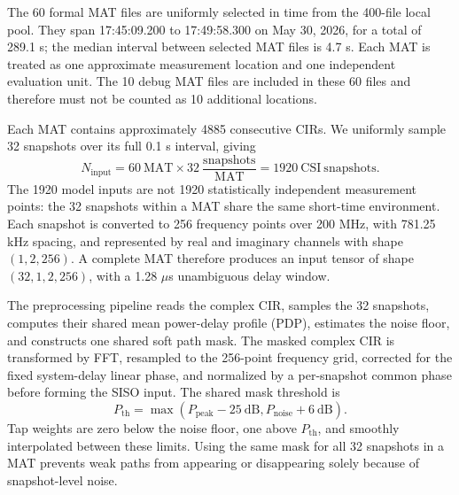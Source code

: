 The 60 formal MAT files are uniformly selected in time from the 400-file local pool. They span
17:45:09.200 to 17:49:58.300 on May 30, 2026, for a total of 289.1 s; the median interval between
selected MAT files is 4.7 s. Each MAT is treated as one approximate measurement location and one
independent evaluation unit. The 10 debug MAT files are included in these 60 files and therefore
must not be counted as 10 additional locations.

Each MAT contains approximately 4885 consecutive CIRs. We uniformly sample 32 snapshots over its
full 0.1 s interval, giving
\begin{equation}
N_{\mathrm{input}}=60\ \mathrm{MAT}\times32\
\frac{\mathrm{snapshots}}{\mathrm{MAT}}=1920\ \mathrm{CSI\ snapshots}.
\label{eq:measured-snapshot-count}
\end{equation}
The 1920 model inputs are not 1920 statistically independent measurement points: the 32 snapshots
within a MAT share the same short-time environment. Each snapshot is converted to 256 frequency
points over 200 MHz, with 781.25 kHz spacing, and represented by real and imaginary channels with
shape \((1,2,256)\). A complete MAT therefore produces an input tensor of shape
\((32,1,2,256)\), with a 1.28 \(\mu\)s unambiguous delay window.

The preprocessing pipeline reads the complex CIR, samples the 32 snapshots, computes their shared
mean power-delay profile (PDP), estimates the noise floor, and constructs one shared soft path mask.
The masked complex CIR is transformed by FFT, resampled to the 256-point frequency grid, corrected
for the fixed system-delay linear phase, and normalized by a per-snapshot common phase before forming
the SISO input. The shared mask threshold is
\begin{equation}
P_{\mathrm{th}}=
\max\!\left(P_{\mathrm{peak}}-25\ \mathrm{dB},
P_{\mathrm{noise}}+6\ \mathrm{dB}\right).
\label{eq:measured-soft-mask}
\end{equation}
Tap weights are zero below the noise floor, one above \(P_{\mathrm{th}}\), and smoothly interpolated
between these limits. Using the same mask for all 32 snapshots in a MAT prevents weak paths from
appearing or disappearing solely because of snapshot-level noise.

